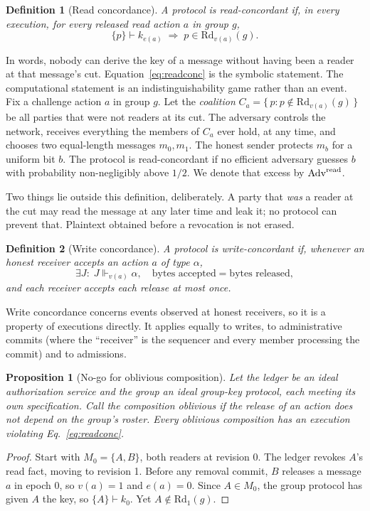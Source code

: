 \documentclass[aps,prx,reprint,superscriptaddress,nofootinbib,floatfix]{revtex4-2}
\newtheorem{definition}{Definition}
\newtheorem{proposition}{Proposition}
\theoremstyle{remark}
\newcommand{\justifies}{\Vdash}           %
\newcommand{\Rd}{\mathrm{Rd}}             %
\newcommand{\cut}{v}                      %
\newcommand{\roster}{M}
\newcommand{\derives}{\vdash}
\newcommand{\Adv}{\mathrm{Adv}}
\begin{document}
\begin{definition}[Read concordance]
A protocol is \emph{read-concordant} if, in every execution, for every released read action $a$ in group $g$,
\begin{equation}
\{p\}\derives k_{e(a)} \;\Longrightarrow\; p\in \Rd_{\cut(a)}(g).
\label{eq:readconc}
\end{equation}
\end{definition}
In words, nobody can derive the key of a message without having been a reader at that message's cut. Equation~\eqref{eq:readconc} is the symbolic statement. The computational statement is an indistinguishability game rather than an event. Fix a challenge action $a$ in group $g$. Let the \emph{coalition} $C_a=\{\,p:p\notin \Rd_{\cut(a)}(g)\,\}$ be all parties that were not readers at its cut. The adversary controls the network, receives everything the members of $C_a$ ever hold, at any time, and chooses two equal-length messages $m_0,m_1$. The honest sender protects $m_b$ for a uniform bit $b$. The protocol is read-concordant if no efficient adversary guesses $b$ with probability non-negligibly above $1/2$. We denote that excess by $\Adv^{\rm read}$.

Two things lie outside this definition, deliberately. A party that \emph{was} a reader at the cut may read the message at any later time and leak it; no protocol can prevent that. Plaintext obtained before a revocation is not erased.

\begin{definition}[Write concordance]
A protocol is \emph{write-concordant} if, whenever an honest receiver accepts an action $a$ of type $\alpha$,
\begin{equation}
\exists J:\; J\justifies_{\cut(a)}\alpha,\quad \text{bytes accepted}=\text{bytes released},
\label{eq:writeconc}
\end{equation}
and each receiver accepts each release at most once.
\end{definition}
Write concordance concerns events observed at honest receivers, so it is a property of executions directly. It applies equally to writes, to administrative commits (where the ``receiver'' is the sequencer and every member processing the commit) and to admissions.

\begin{proposition}[No-go for oblivious composition]\label{prop:oblivious}
Let the ledger be an ideal authorization service and the group an ideal group-key protocol, each meeting its own specification. Call the composition \emph{oblivious} if the release of an action does not depend on the group's roster. Every oblivious composition has an execution violating Eq.~\eqref{eq:readconc}.
\end{proposition}
\begin{proof}
Start with $\roster_0=\{A,B\}$, both readers at revision 0. The ledger revokes $A$'s read fact, moving to revision 1. Before any removal commit, $B$ releases a message $a$ in epoch 0, so $\cut(a)=1$ and $e(a)=0$. Since $A\in\roster_0$, the group protocol has given $A$ the key, so $\{A\}\derives k_0$. Yet $A\notin \Rd_1(g)$.
\end{proof}
\end{document}
